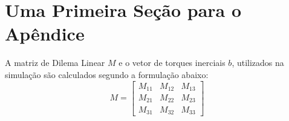 \section{Uma Primeira Seção para o Apêndice}

A matriz de Dilema Linear $M$ e o vetor de torques inerciais $b$,
utilizados na simulação são calculados segundo a formulação 
abaixo:
\begin{equation}
M=\left[ \begin{array}{ccc}
M_{11} & M_{12} & M_{13} \\
M_{21} & M_{22} & M_{23} \\
M_{31} & M_{32} & M_{33}
\end{array} \right]
\end{equation}

